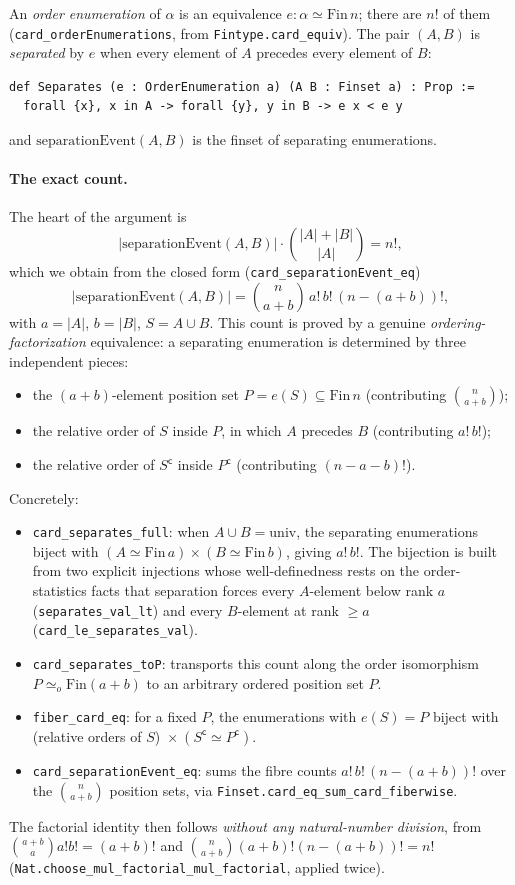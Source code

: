 \documentclass[11pt]{article}
\newcommand{\bind}[2]{\binom{#1}{#2}}
\begin{document}
An \emph{order enumeration} of $\alpha$ is an equivalence $e:\alpha\simeq\mathrm{Fin}\,n$;
there are $n!$ of them (\lstinline{card_orderEnumerations}, from
\lstinline{Fintype.card_equiv}). The pair $(A,B)$ is \emph{separated} by $e$ when every
element of $A$ precedes every element of $B$:
\begin{verbatim}
def Separates (e : OrderEnumeration a) (A B : Finset a) : Prop :=
  forall {x}, x in A -> forall {y}, y in B -> e x < e y
\end{verbatim}
and $\mathrm{separationEvent}(A,B)$ is the finset of separating enumerations.

\paragraph{The exact count.} The heart of the argument is
\[ |\mathrm{separationEvent}(A,B)|\cdot\bind{|A|+|B|}{|A|} = n!, \]
which we obtain from the closed form (\lstinline{card_separationEvent_eq})
\[ |\mathrm{separationEvent}(A,B)| = \bind{n}{a+b}\,a!\,b!\,(n-(a{+}b))!, \]
with $a=|A|$, $b=|B|$, $S=A\cup B$. This count is proved by a genuine
\emph{ordering-factorization} equivalence: a separating enumeration is determined by
three independent pieces:
\begin{itemize}
\item the $(a{+}b)$-element position set $P=e(S)\subseteq\mathrm{Fin}\,n$ (contributing
  $\bind{n}{a+b}$);
\item the relative order of $S$ inside $P$, in which $A$ precedes $B$ (contributing
  $a!\,b!$);
\item the relative order of $S^{\mathsf c}$ inside $P^{\mathsf c}$ (contributing
  $(n-a-b)!$).
\end{itemize}
Concretely:
\begin{itemize}
\item \lstinline{card_separates_full}: when $A\cup B=\mathrm{univ}$, the separating
  enumerations biject with $(A\simeq\mathrm{Fin}\,a)\times(B\simeq\mathrm{Fin}\,b)$,
  giving $a!\,b!$. The bijection is built from two explicit injections whose
  well-definedness rests on the order-statistics facts that separation forces every
  $A$-element below rank $a$ (\lstinline{separates_val_lt}) and every $B$-element at
  rank $\ge a$ (\lstinline{card_le_separates_val}).
\item \lstinline{card_separates_toP}: transports this count along the order isomorphism
  $P\simeq_o\mathrm{Fin}(a{+}b)$ to an arbitrary ordered position set $P$.
\item \lstinline{fiber_card_eq}: for a fixed $P$, the enumerations with $e(S)=P$ biject
  with (relative orders of $S$)~$\times~(S^{\mathsf c}\simeq P^{\mathsf c})$.
\item \lstinline{card_separationEvent_eq}: sums the fibre counts $a!\,b!\,(n-(a{+}b))!$
  over the $\bind{n}{a+b}$ position sets, via
  \lstinline{Finset.card_eq_sum_card_fiberwise}.
\end{itemize}
The factorial identity then follows \emph{without any natural-number division}, from
$\bind{a+b}{a}a!b!=(a+b)!$ and $\bind{n}{a+b}(a+b)!(n-(a{+}b))!=n!$
(\lstinline{Nat.choose_mul_factorial_mul_factorial}, applied twice).
\end{document}
